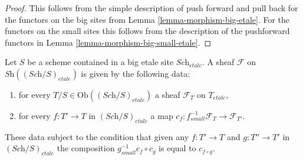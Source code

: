 \begin{proof}
This follows from the simple description of push forward
and pull back for the functors on the big sites from
Lemma \ref{lemma-morphism-big-etale}. For the functors
on the small sites this follows from the description of
the pushforward functors in Lemma \ref{lemma-morphism-big-small-etale}.
\end{proof}

\begin{lemma}
\label{lemma-characterize-sheaf-big-etale}
Let $S$ be a scheme contained in a big etale site $\textit{Sch}_{etale}$.
A sheaf $\mathcal{F}$ on $\textit{Sh}((\textit{Sch}/S)_{etale})$
is given by the following data:
\begin{enumerate}
\item for every $T/S \in \text{Ob}((\textit{Sch}/S)_{etale})$ a sheaf
$\mathcal{F}_T$ on $T_{etale}$,
\item for every $f : T' \to T$ in
$(\textit{Sch}/S)_{etale}$ a map
$c_f : f_{small}^{-1}\mathcal{F}_{T} \to \mathcal{F}_{T'}$.
\end{enumerate}
These data subject to the condition that given any $f : T' \to T$ and
$g : T'' \to T'$ in $(\textit{Sch}/S)_{etale}$ the composition
$g^{-1}_{small}c_f \circ c_g$ is equal to $c_{f \circ g}$.
\end{lemma}

